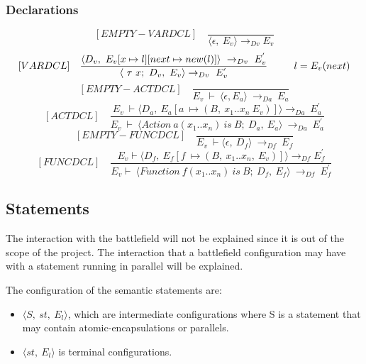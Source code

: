 \subsubsection{Declarations}	
\[	
[EMPTY-VARDCL] \quad	
\dfrac{}{\langle\epsilon, \ E_v\rangle \rightarrow_{Dv} E_v}	
\]\newline
\[	
[VARDCL] \quad	
\dfrac{ \langle D_v, \ E_v[x \mapsto l][next \mapsto new(l)]\rangle \ \rightarrow_{Dv} \ E_v^{'}}{ \langle \ \tau \ x; \ D_v,\ E_v \rangle \rightarrow_{Dv} \ E_v^{'}} \newline	
\qquad \ \ l = E_v(next)	
\]\newline
\[	
[EMPTY-ACTDCL] \quad	
\dfrac{}{E_v \ \vdash \ \langle \epsilon, E_a \rangle \ \rightarrow_{Da} \ E_a}	
\]\newline
\[	
[ACTDCL] \quad	
\dfrac{E_v \ \vdash \langle D_a, \ E_a[a \ \mapsto (B, \ x_1 .. x_n \ E_v)] \rangle \rightarrow_{Da} \ E_a^{'}}{E_v \ \vdash \ \langle Action \ a(x_1 .. x_n) \ is \ B; \ D_a, \ E_a \rangle \ \rightarrow_{Da} \ E_a^{'}}	
\]\newline
\[	
[EMPTY-FUNCDCL] \quad	
\dfrac{}{E_v \ \vdash \langle \epsilon, \ D_f \rangle \ \rightarrow_{Df} \ E_f}	
\]\newline
\[	
[FUNCDCL] \quad	
\dfrac{E_v \vdash \langle D_f, \ E_f[f \ \mapsto (B, \ x_1 .. x_n, \ E_v)] \rangle \rightarrow_{Df} E_f^{'}}{E_v \vdash \ \langle Function \ f(x_1 .. x_n) \ is \ B; \ D_f, \ E_f \rangle \ \rightarrow_{Df} \ E_f^{'}}	
\]

\subsection{Statements}
The interaction with the battlefield will not be explained since it is out of the scope of the project. The interaction that a battlefield configuration may have with a statement running in parallel will be explained.

The configuration of the semantic statements are:
\begin{itemize}
	\item \begin{math} \langle S, \ st, \ E_l \rangle \end{math}, which are intermediate configurations where S is a statement that may contain atomic-encapsulations or parallels.
	\item \begin{math} \langle st, \ E_l \rangle \end{math} is terminal configurations.	
\end{itemize}

